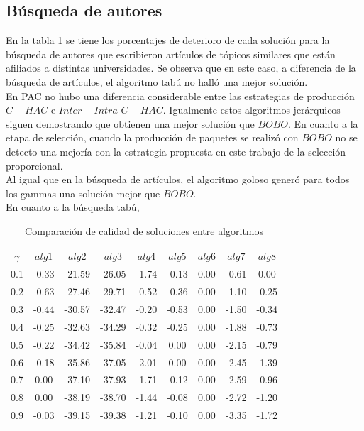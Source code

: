 \subsection{Búsqueda de autores}
En la tabla \ref{tabla:comp2} se tiene los porcentajes de deterioro de cada solución para la búsqueda de autores que escribieron artículos de tópicos similares que están afiliados a distintas universidades. Se observa que en este caso, a diferencia de la búsqueda de artículos, el algoritmo tabú no halló una mejor solución.\\
En PAC no hubo una diferencia considerable entre las estrategias de producción $C-HAC$ e $Inter-Intra$ $C-HAC$. Igualmente estos algoritmos jerárquicos siguen demostrando que obtienen una mejor solución que $BOBO$. En cuanto a la etapa de selección, cuando la producción de paquetes se realizó con $BOBO$ no se detecto una mejoría con la estrategia propuesta en este trabajo de la selección proporcional.\\
Al igual que en la búsqueda de artículos, el algoritmo goloso generó para todos los gammas una solución mejor que $BOBO$.\\
En cuanto a la búsqueda tabú, 
\begin{table}[H]
\begin{center}
\begin{tabular}{|c|c|c|c|c|c|c|c|c|}
\hline
$\gamma$&$alg1$&$alg2$&$alg3$&$alg4$&$alg5$&$alg6$&$alg7$&$alg8$ \\ \hline
0.1 & -0.33 & -21.59 & -26.05 & -1.74 & -0.13 & 0.00 & -0.61 & 0.00 \\
0.2 & -0.63 & -27.46 & -29.71 & -0.52 & -0.36 & 0.00 & -1.10 & -0.25 \\
0.3 & -0.44 & -30.57 & -32.47 & -0.20 & -0.53 & 0.00 & -1.50 & -0.34 \\
0.4 & -0.25 & -32.63 & -34.29 & -0.32 & -0.25 & 0.00 & -1.88 & -0.73 \\
0.5 & -0.22 & -34.42 & -35.84 & -0.04 & 0.00 & 0.00 & -2.15 & -0.79 \\
0.6 & -0.18 & -35.86 & -37.05 & -2.01 & 0.00 & 0.00 & -2.45 & -1.39 \\
0.7 & 0.00 & -37.10 & -37.93 & -1.71 & -0.12 & 0.00 & -2.59 & -0.96 \\ 
0.8 & 0.00 & -38.19 & -38.70 & -1.44 & -0.08 & 0.00 & -2.72 & -1.20 \\
0.9 & -0.03 & -39.15 & -39.38 & -1.21 & -0.10 & 0.00 & -3.35 & -1.72 \\ \hline 
\end{tabular}
\caption{Comparación de calidad de soluciones entre algoritmos} 
\label{tabla:comp2}
\end{center}
\end{table}

